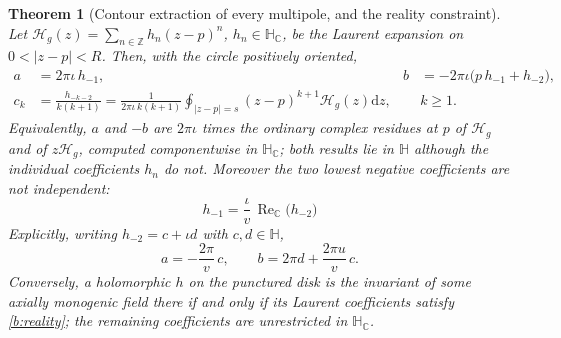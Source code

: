 \documentclass[11pt,a4paper]{article}
\numberwithin{equation}{section}
\newtheorem{theorem}{Theorem}[section]
\theoremstyle{definition}
\theoremstyle{remark}
\theoremstyle{plain}
\newcommand{\HH}{\mathbb H}
\newcommand{\HC}{\mathbb H_{\mathbb C}}
\newcommand{\CC}{\mathbb C}
\newcommand{\ZZ}{\mathbb Z}
\DeclareMathOperator{\Rea}{Re}
\newcommand{\ReC}{\Rea_{\CC}}
\newcommand{\Hg}{\mathcal H_{g}}      %
\newcommand{\abs}[1]{\lvert #1\rvert}
\newcommand{\dd}{\mathrm d}
\begin{document}
\begin{theorem}[Contour extraction of every multipole, and the reality
constraint]
\label{b:thm:reality}
Let $\Hg(z)=\sum_{n\in\ZZ}h_n(z-p)^n$, $h_n\in\HC$, be the Laurent expansion
on $0<\abs{z-p}<R$.  Then, with the circle positively oriented,
\begin{align}
 a&=2\pi\iota\,h_{-1},
 &
 b&=-2\pi\iota\bigl(p\,h_{-1}+h_{-2}\bigr),
 \label{b:residue-pair}\\
 c_k&=\frac{h_{-k-2}}{k(k+1)}
 =\frac{1}{2\pi\iota\,k(k+1)}\oint_{\abs{z-p}=s}(z-p)^{k+1}\Hg(z)\dd z,
 &&k\ge1 .
 \label{b:multipoles}
\end{align}
Equivalently, $a$ and $-b$ are $2\pi\iota$ times the ordinary complex
residues at $p$ of $\Hg$ and of $z\Hg$, computed componentwise in $\HC$;
both results lie in $\HH$ although the individual coefficients $h_n$ do not.
Moreover the two lowest negative coefficients are \emph{not} independent:
\begin{equation}
 \boxed{\ h_{-1}=\frac{\iota}{v}\,\ReC\bigl(h_{-2}\bigr)\ }
 \label{b:reality}
\end{equation}
Explicitly, writing $h_{-2}=c+\iota d$ with $c,d\in\HH$,
\begin{equation}
 a=-\frac{2\pi}{v}\,c,
 \qquad
 b=2\pi d+\frac{2\pi u}{v}\,c .
 \label{b:one-coefficient}
\end{equation}
Conversely, a holomorphic $h$ on the punctured disk is the invariant of some
axially monogenic field there if and only if its Laurent coefficients satisfy
\eqref{b:reality}; the remaining coefficients are unrestricted in $\HC$.
\end{theorem}
\end{document}
